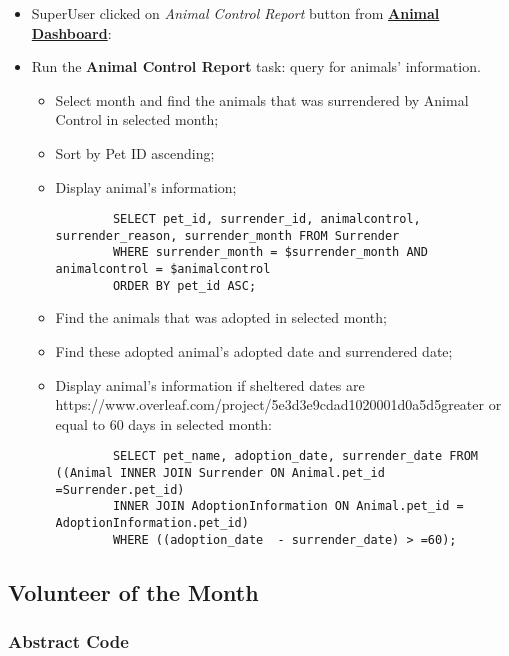\documentclass[a4paper]{article}
\begin{document}
\begin{itemize}
	\item SuperUser clicked on \textit{Animal Control Report} button from \underline{\textbf{Animal Dashboard}}:
	\item Run the \textbf{Animal Control Report} task: query for animals' information.
	\begin{itemize}
		\item Select month and find the animals that was surrendered by Animal Control in selected month;
		\item Sort by Pet ID ascending;
		\item Display animal's information;
		\begin{lstlisting}
		SELECT pet_id, surrender_id, animalcontrol, surrender_reason, surrender_month FROM Surrender
		WHERE surrender_month = $surrender_month AND animalcontrol = $animalcontrol
		ORDER BY pet_id ASC;
		\end{lstlisting}

		\item Find the animals that was adopted in selected month;
		\item Find these adopted animal's adopted date and surrendered date;
		\item Display animal's information if sheltered dates are https://www.overleaf.com/project/5e3d3e9cdad1020001d0a5d5greater or equal to 60 days in selected month:
		\begin{lstlisting}
		SELECT pet_name, adoption_date, surrender_date FROM ((Animal INNER JOIN Surrender ON Animal.pet_id =Surrender.pet_id)
		INNER JOIN AdoptionInformation ON Animal.pet_id = AdoptionInformation.pet_id)
		WHERE ((adoption_date  - surrender_date) > =60);
		\end{lstlisting}
	\end{itemize}
\end{itemize}

\hypertarget{volunteer_of_the_month}{\subsection{Volunteer of the Month}}

\subsubsection*{Abstract Code}
\end{document}
